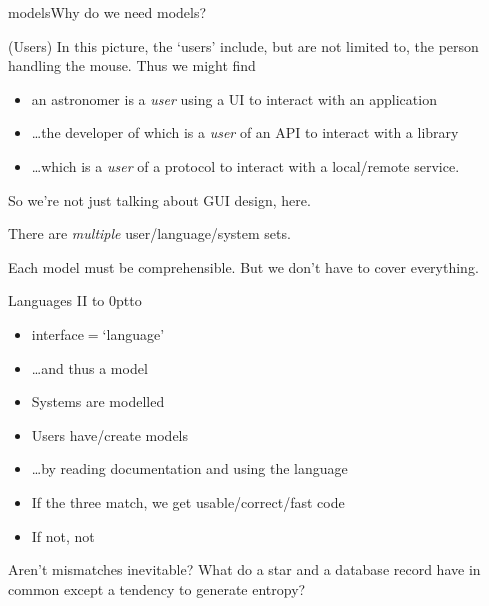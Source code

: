\documentclass[pdf,final,norman]{prosper}
\newenvironment{myslide}[1]{\begin{slide}{#1}\slidetoc{#1}}{\end{slide}}
\begin{document}
\begin{slidegroup}{models}{Why do we need models?}
\begin{myslide}{(Users)}
In this picture, the `users' include, but are not limited to, the
person handling the mouse.  Thus we might find
  \begin{itemize}
    \item an astronomer is a \emph{user} using a UI to interact with an
      application
    \item \dots the developer of which is a \emph{user} of an API to
      interact with a library
    \item \dots which is a \emph{user} of a protocol to interact
      with a local/remote service.
  \end{itemize}
So we're not just talking about GUI design, here.

There are \emph{multiple} user/language/system sets.

Each model must be comprehensible.  But we don't have to cover everything.

\end{myslide}

\begin{myslide}{Languages II}
\vbox to 0pt{\hbox to \vss}
\begin{itemize}
\item interface${}={}$`language'
\item \dots and thus a model
\item Systems are modelled
\item Users have/create models
\item \dots by reading documentation and using the language
\item If the three match, we get usable/correct/fast code
\item If not, not
\end{itemize}
Aren't mismatches inevitable?  What do a star and a database record
have in common except a tendency to generate entropy?
\end{myslide}


\end{slidegroup}
\end{document}
